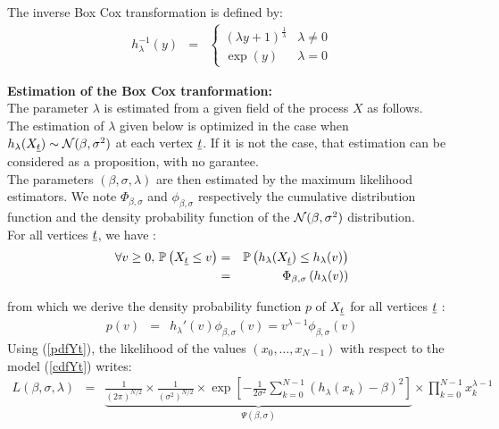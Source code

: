 The inverse Box Cox transformation is defined by:
\begin{eqnarray}
  \label{InverseBoxCoxModel}
  h^{-1}_\lambda(y) & = &
  \left\{
  \begin{array}{ll}
    \displaystyle (\lambda y + 1)^{\frac{1}{\lambda}} & \lambda \neq 0 \\
    \displaystyle \exp(y)                          & \lambda = 0
  \end{array}
  \right.
\end{eqnarray}
\vspace*{0.1cm}

{\bf Estimation of the Box Cox tranformation: }\\
The parameter $\lambda$ is estimated from a given field of the process $X$ as follows.\\
The estimation of $\lambda$ given below is optimized in the case when $h_\lambda(X_{{\underline{t}}}) \sim {\mathcal N}(\beta , \sigma^2 )$ at each vertex ${\underline{t}}$. If it is not the case, that estimation can be considered as a proposition, with no garantee.\\
The parameters $(\beta,\sigma,\lambda)$ are then estimated by the maximum likelihood estimators. We note $\Phi_{\beta, \sigma}$ and $\phi_{\beta, \sigma}$ respectively the cumulative distribution function and the density probability function of the ${\mathcal N}(\beta , \sigma^2)$ distribution.\\
For all vertices ${\underline{t}}$, we have :
\begin{eqnarray}\label{cdfYt}
  \forall v \geq 0, \, {\mathbb P}\left(  X_{{\underline{t}}} \leq v  \right) & = & {\mathbb P}\left(  h_\lambda(X_{{\underline{t}}}) \leq h_\lambda(v)  \right) \\
  & = & \Phi_{\beta, \sigma} \left(h_\lambda(v)\right)
\end{eqnarray}

from which we derive the  density probability function $p$ of $X_{{\underline{t}}}$ for all vertices ${\underline{t}}$ :
\begin{eqnarray}\label{pdfYt}
  p(v) & = & h_\lambda'(v)\phi_{\beta, \sigma}(v) = v^{\lambda - 1}\phi_{\beta, \sigma}(v)
\end{eqnarray}
Using (\ref{pdfYt}), the likelihood of the values $(x_0, \dots, x_{N-1})$ with respect to the model (\ref{cdfYt})  writes:
\begin{eqnarray}\label{LKH}
  L(\beta,\sigma,\lambda)
  & = &
  \underbrace{ \frac{1}{(2\pi)^{N/2}}
    \times
    \frac{1}{(\sigma^2)^{N/2}}
    \times
    \exp\left[
      -\frac{1}{2\sigma^2}
      \sum_{k=0}^{N-1}
      \left(
      h_\lambda(x_k)-\beta
      \right)^2
      \right]
  }_{\Psi(\beta, \sigma)}
  \times
  \prod_{k=0}^{N-1} x_k^{\lambda - 1}
\end{eqnarray}



